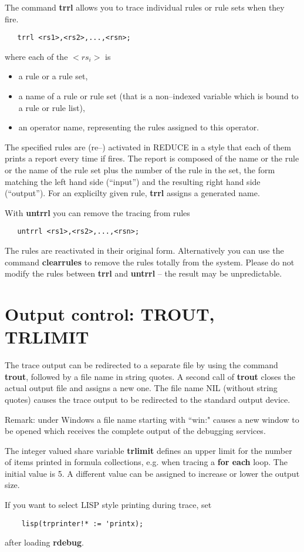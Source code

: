 The command {\bf trrl} allows you to trace individual rules
or rule sets when they fire.
\begin{verbatim}
   trrl <rs1>,<rs2>,...,<rsn>;
\end{verbatim}
where each of the $<rs_i>$ is
\begin{itemize}
\item a rule or a rule set,
\item a name of a rule or rule set (that is a non--indexed variable which
      is bound to a rule or rule list),
\item an operator name, representing the rules assigned to this
      operator.
\end{itemize}
The specified rules are (re--) activated in {\small REDUCE} in
a style that each of them prints a report every time if fires.
The report is composed of the name or the rule or the 
name of the rule set plus the number of the rule in the set,
the form matching the left hand side (``input'') and the 
resulting right hand side (``output''). 
For an explicilty given rule, {\bf trrl} assigns a generated name.

With {\bf untrrl} you can remove the tracing from rules
\begin{verbatim}
   untrrl <rs1>,<rs2>,...,<rsn>;
\end{verbatim}
The rules are reactivated in their original form. Alternatively
you can use the command {\bf clearrules} to remove the
rules totally from the system. Please do not modify the
rules between {\bf trrl} and {\bf untrrl} -- the result
may be unpredictable.   

\section{Output control: TROUT, TRLIMIT}

The trace output can be redirected to a separate file
by using the command {\bf trout}, followed
by a file name in string quotes. A second call of {\bf trout}
closes the actual output file and assigns a new one. 
The file name NIL (without string quotes) causes the trace output 
to be redirected to the standard output device.

Remark: under Windows a file name starting with ``win:" causes
a new window to be opened which receives the complete 
output of the debugging services.

The integer valued share variable {\bf trlimit} defines
an upper limit for the number of items printed in formula
collections, e.g. when tracing a {\bf for each} loop. The
initial value is 5. A different value can be assigned to
increase or lower the output size.

If you want to select LISP style printing during trace, set
\begin{verbatim}
    lisp(trprinter!* := 'printx);
\end{verbatim}
after loading {\bf rdebug}.
 


